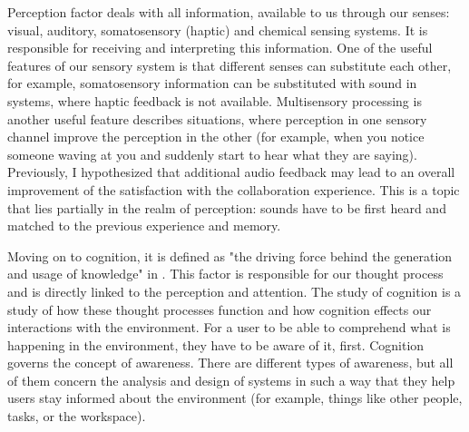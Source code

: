 Perception factor deals with all information, available to us through our senses: visual, auditory, somatosensory (haptic) and chemical sensing systems. It is responsible for receiving and interpreting this information.
One of the useful features of our sensory system is that different senses can substitute each other, for example, somatosensory information can be substituted with sound in systems, where haptic feedback is not available. Multisensory processing is another useful feature describes situations, where perception in one sensory channel improve the perception in the other (for example, when you notice someone waving at you and suddenly start to hear what they are saying).
Previously, I hypothesized that additional audio feedback may lead to an overall improvement of the satisfaction with the collaboration experience. This is a topic that lies partially in the realm of perception: sounds have to be first heard and matched to the previous experience and memory.

Moving on to cognition, it is defined as "the driving force behind the generation and usage of knowledge" in \parencite{jr_3d_2017}. This factor is responsible for our thought process and is directly linked to the perception and attention. The study of cognition is a study of how these thought processes function and how cognition effects our interactions with the environment.
For a user to be able to comprehend what is happening in the environment, they have to be aware of it, first. Cognition governs the concept of awareness. There are different types of awareness, but all of them concern the analysis and design of systems in such a way that they help users stay informed about the environment (for example, things like other people, tasks, or the workspace).

